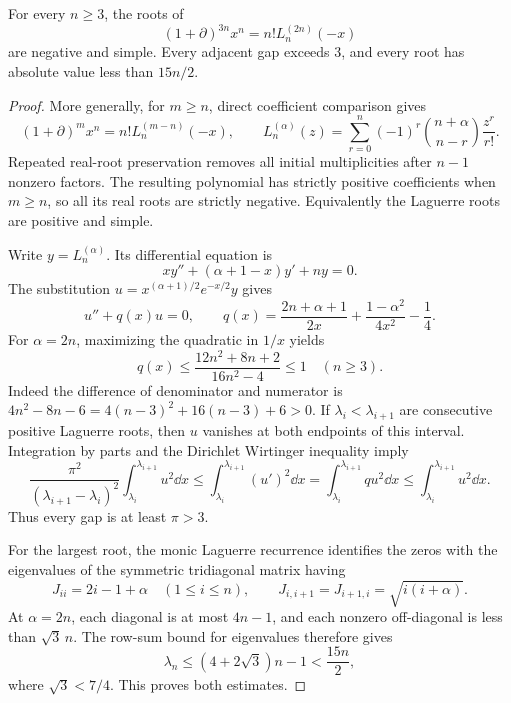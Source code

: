 \begin{lemma}
\label{mesh:lem:laguerre}
For every $n\geq3$, the roots of
\begin{equation}\label{mesh:eq:laguerre-block}
 (1+\partial)^{3n}x^n=n!L_n^{(2n)}(-x)
\end{equation}
are negative and simple. Every adjacent gap exceeds $3$, and every
root has absolute value less than $15n/2$.
\end{lemma}
\begin{proof}
More generally, for $m\geq n$, direct coefficient comparison gives
\[
 (1+\partial)^m x^n=n!L_n^{(m-n)}(-x),\qquad
 L_n^{(\alpha)}(z)=\sum_{r=0}^n
       (-1)^r\binom{n+\alpha}{n-r}\frac{z^r}{r!}.
\]
Repeated real-root preservation removes all initial multiplicities
after $n-1$ nonzero factors. The resulting polynomial has strictly
positive coefficients when $m\geq n$, so all its real roots are
strictly negative. Equivalently the Laguerre roots are positive
and simple.

Write $y=L_n^{(\alpha)}$. Its differential equation is
\[
 xy''+(\alpha+1-x)y'+ny=0.
\]
The substitution $u=x^{(\alpha+1)/2}e^{-x/2}y$ gives
\begin{equation}\label{mesh:eq:laguerre-normal}
 u''+q(x)u=0,\qquad
 q(x)=\frac{2n+\alpha+1}{2x}
       +\frac{1-\alpha^2}{4x^2}-\frac14.
\end{equation}
For $\alpha=2n$, maximizing the quadratic in $1/x$ yields
\begin{equation}\label{mesh:eq:potential-bound}
 q(x)\leq\frac{12n^2+8n+2}{16n^2-4}\leq1\quad(n\geq3).
\end{equation}
Indeed the difference of denominator and numerator is
$4n^2-8n-6=4(n-3)^2+16(n-3)+6>0$.
If $\lambda_i<\lambda_{i+1}$ are consecutive positive Laguerre roots,
then $u$ vanishes at both endpoints of this interval. Integration by
parts and the Dirichlet Wirtinger inequality imply
\[
 \frac{\pi^2}{(\lambda_{i+1}-\lambda_i)^2}
       \int_{\lambda_i}^{\lambda_{i+1}}u^2\dd x
 \leq\int_{\lambda_i}^{\lambda_{i+1}}(u')^2\dd x
 =\int_{\lambda_i}^{\lambda_{i+1}}q u^2\dd x
 \leq\int_{\lambda_i}^{\lambda_{i+1}}u^2\dd x.
\]
Thus every gap is at least $\pi>3$.

For the largest root, the monic Laguerre recurrence identifies the
zeros with the eigenvalues of the symmetric tridiagonal matrix having
\[
 J_{ii}=2i-1+\alpha\quad(1\leq i\leq n),\qquad
 J_{i,i+1}=J_{i+1,i}=\sqrt{i(i+\alpha)}.
\]
At $\alpha=2n$, each diagonal is at most $4n-1$, and each
nonzero off-diagonal is less than $\sqrt3\,n$. The row-sum
bound for eigenvalues therefore gives
\[
 \lambda_n\leq(4+2\sqrt3)n-1<\frac{15n}{2},
\]
where $\sqrt3<7/4$. This proves both estimates.
\end{proof}

